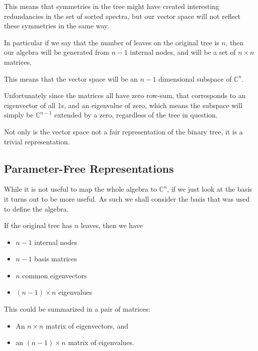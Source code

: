 \documentclass{report}
\begin{document}
This means that symmetries in the tree might have created interesting
redundancies in the set of sorted spectra, but our vector space will not
reflect these symmetries in the same way.

In particular if we say that the number of leaves on the original tree is $n$,
then our algebra will be generated from $n-1$ internal nodes, and will be a set
of $n \times n$ matrices.

This means that the vector space will be an $n-1$ dimensional subspace of
$\mathds{C}^n$.

Unfortunately since the matrices all have zero row-sum, that corresponds to an
eigenvector of all 1s, and an eigenvalue of zero, which means the subspace will
simply be $\mathds{C}^{n-1}$ extended by a zero, regardless of the tree in
question.

Not only is the vector space not a fair representation of the binary tree, it
is a trivial representation.

\subsection{Parameter-Free Representations}

While it is not useful to map the whole algebra to $\mathds{C}^n$, if we just
look at the basis it turns out to be more useful.
As such we shall consider the basis that was used to define the algebra.

If the original tree has $n$ leaves, then we have
\begin{itemize}
	\item $n-1$ internal nodes
	\item $n-1$ basis matrices
	\item $n$ common eigenvectors
	\item $(n-1) \times n$ eigenvalues
\end{itemize}

This could be summarized in a pair of matrices:
\begin{itemize}
	\item An $n \times n$ matrix of eigenvectors, and
	\item an $(n-1) \times n$ matrix of eigenvalues.
\end{itemize}
\end{document}
